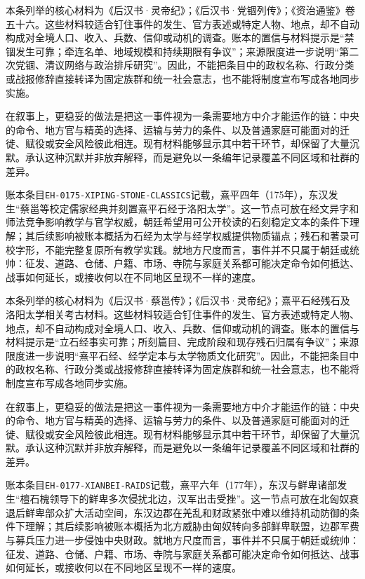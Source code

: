 本条列举的核心材料为《后汉书·灵帝纪》；《后汉书·党锢列传》；《资治通鉴》卷五十六。这些材料较适合钉住事件的发生、官方表述或特定人物、地点，却不自动构成对全境人口、收入、兵数、信仰或动机的调查。账本的置信与材料提示是“禁锢发生可靠；牵连名单、地域规模和持续期限有争议”；来源限度进一步说明“第二次党锢、清议网络与政治排斥研究”。因此，不能把条目中的政权名称、行政分类或战报修辞直接转译为固定族群和统一社会意志，也不能将制度宣布写成各地同步实施。

在叙事上，更稳妥的做法是把这一事件视为一条需要地方中介才能运作的链：中央的命令、地方官与精英的选择、运输与劳力的条件、以及普通家庭可能面对的迁徙、赋役或安全风险彼此相连。现有材料能够显示其中若干环节，却保留了大量沉默。承认这种沉默并非放弃解释，而是避免以一条编年记录覆盖不同区域和社群的差异。

账本条目\texttt{EH-0175-XIPING-STONE-CLASSICS}记载，熹平四年（175年），东汉发生“蔡邕等校定儒家经典并刻置熹平石经于洛阳太学”。这一节点可放在经文异字和师法竞争影响教学与官学权威，朝廷希望用可公开校读的石刻稳定文本的条件下理解；其后续影响被账本概括为石经为太学与经学权威提供物质锚点；残石和著录可校字形，不能完整复原所有教学实践。就地方尺度而言，事件并不只属于朝廷或统帅：征发、道路、仓储、户籍、市场、寺院与家庭关系都可能决定命令如何抵达、战事如何延长，或接收何以在不同地区呈现不一样的速度。

本条列举的核心材料为《后汉书·蔡邕传》；《后汉书·灵帝纪》；熹平石经残石及洛阳太学相关考古材料。这些材料较适合钉住事件的发生、官方表述或特定人物、地点，却不自动构成对全境人口、收入、兵数、信仰或动机的调查。账本的置信与材料提示是“立石经事实可靠；所刻篇目、完成阶段和现存残石归属有争议”；来源限度进一步说明“熹平石经、经学定本与太学物质文化研究”。因此，不能把条目中的政权名称、行政分类或战报修辞直接转译为固定族群和统一社会意志，也不能将制度宣布写成各地同步实施。

在叙事上，更稳妥的做法是把这一事件视为一条需要地方中介才能运作的链：中央的命令、地方官与精英的选择、运输与劳力的条件、以及普通家庭可能面对的迁徙、赋役或安全风险彼此相连。现有材料能够显示其中若干环节，却保留了大量沉默。承认这种沉默并非放弃解释，而是避免以一条编年记录覆盖不同区域和社群的差异。

账本条目\texttt{EH-0177-XIANBEI-RAIDS}记载，熹平六年（177年），东汉与鲜卑诸部发生“檀石槐领导下的鲜卑多次侵扰北边，汉军出击受挫”。这一节点可放在北匈奴衰退后鲜卑部众扩大活动空间，东汉边郡在羌乱和财政紧张中难以维持机动防御的条件下理解；其后续影响被账本概括为北方威胁由匈奴转向多部鲜卑联盟，边郡军费与募兵压力进一步侵蚀中央财政。就地方尺度而言，事件并不只属于朝廷或统帅：征发、道路、仓储、户籍、市场、寺院与家庭关系都可能决定命令如何抵达、战事如何延长，或接收何以在不同地区呈现不一样的速度。

